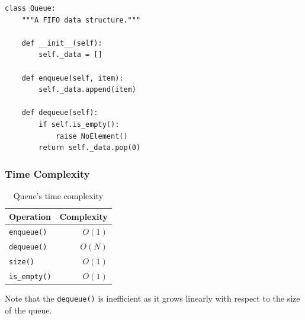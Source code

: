 \documentclass[aspectratio=169, 14pt]{beamer}
\begin{document}
\begin{frame}[fragile]
\begin{columns}
\end{columns}


\end{frame}

\begin{frame}[fragile]
    \begin{verbatim}
class Queue:
    """A FIFO data structure."""

    def __init__(self):
        self._data = []

    def enqueue(self, item):
        self._data.append(item)

    def dequeue(self):
        if self.is_empty():
            raise NoElement()
        return self._data.pop(0)
    \end{verbatim}
\end{frame}

\begin{frame}
    \frametitle{Time Complexity}
    \begin{table}
        \caption{Queue's time complexity}
        \begin{tabular}{lr}
          \toprule
          Operation & Complexity\\
          \midrule
          \texttt{enqueue()} & $O(1)$\\
          \texttt{dequeue()} & $O(N)$ \\
          \texttt{size()} & $O(1)$ \\
          \texttt{is\_empty()} & $O(1)$ \\ 
          \bottomrule
        \end{tabular}
    \end{table}    
    Note that the \texttt{dequeue()} is inefficient as it grows linearly with respect to the size of the queue.
\end{frame}
\end{document}

